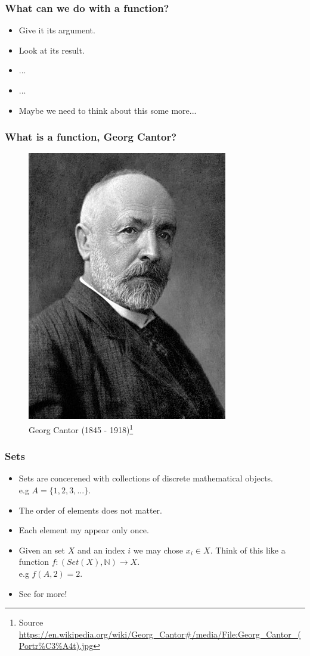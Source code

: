 \documentclass
  [hyperref={colorlinks = true,linkcolor = blue, 
             citecolor = blue, urlcolor = blue}
  ]{beamer}
\begin{document}
\begin{frame}[fragile]
\frametitle{What can we do with a function?}
  \begin{itemize}[<+->]
    \item Give it its argument.
    \item Look at its result.
    \item ...
    \item ...
    \item Maybe we need to think about this some more...
  \end{itemize}
\end{frame}


\begin{frame}[fragile]
\frametitle{Sets}
  \begin{itemize}[<+->]
    \item Sets are concerened with collections of discrete
          mathematical objects. \\
          e.g $A = \{1, 2, 3, ...\}$.
    \item The order of elements does not matter.
    \item Each element my appear only once.
    \item Given an set $X$ and an index $i$ we may 
          chose $x_i \in X$. Think of this like a function
          $f : (Set(X), \mathbb{N}) \rightarrow X$. \\
          e.g $f(A,2) = 2$.
    \item See \citep{halmos1960naive} for more!
  \end{itemize}
\end{frame}
\end{document}
